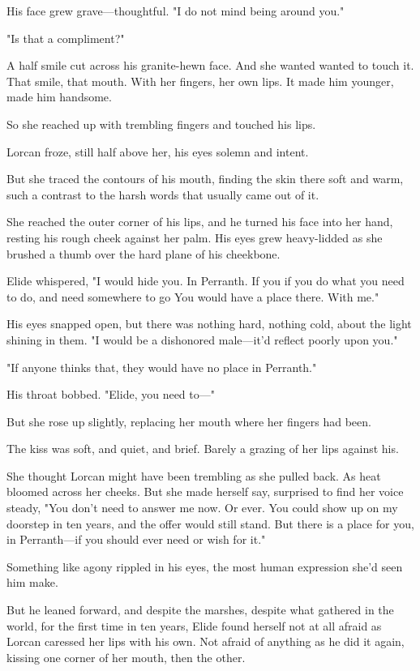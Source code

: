 His face grew grave---thoughtful. "I do not mind  being around you."

"Is that a compliment?"

A half smile cut across his granite-hewn face. And she wanted 
wanted to touch it. That smile, that mouth. With her fingers, her own lips. It made him younger, made him  handsome.

So she reached up with trembling fingers and touched his lips.

Lorcan froze, still half above her, his eyes solemn and intent.

But she traced the contours of his mouth, finding the skin there soft and warm, such a contrast to the harsh words that usually came out of it.

She reached the outer corner of his lips, and he turned his face into her hand, resting his rough cheek against her palm. His eyes grew heavy-lidded as she brushed a thumb over the hard plane of his cheekbone.

Elide whispered, "I would hide you. In Perranth. If you  if you do what you need to do, and need somewhere to go  You would have a place there. With me."

His eyes snapped open, but there was nothing hard, nothing cold, about the light shining in them. "I would be a dishonored male---it'd reflect poorly upon you."

"If anyone thinks that, they would have no place in Perranth."

His throat bobbed. "Elide, you need to---"

But she rose up slightly, replacing her mouth where her fingers had been.

The kiss was soft, and quiet, and brief. Barely a grazing of her lips against his.

She thought Lorcan might have been trembling as she pulled back. As heat bloomed across her cheeks. But she made herself say, surprised to find her voice steady, "You don't need to answer me now. Or ever. You could show up on my doorstep in ten years, and the offer would still stand. But there is a place for you, in Perranth---if you should ever need or wish for it."

Something like agony rippled in his eyes, the most human expression she'd seen him make.

But he leaned forward, and despite the marshes, despite what gathered in the world, for the first time in ten years, Elide found herself not at all afraid as Lorcan caressed her lips with his own. Not afraid of anything as he did it again, kissing one corner of her mouth, then the other.

